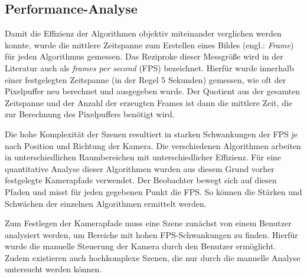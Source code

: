 \documentclass[crop=false]{standalone}
\begin{document}
    \subsection{Performance-Analyse} %
    \label{ssub:performance_analyse}
      Damit die Effizienz der Algorithmen objektiv miteinander verglichen werden konnte, wurde die mittlere Zeitspanne zum Erstellen eines Bildes (engl.: \textit{Frame}) für jeden Algorithmus gemessen.
      Das Reziproke dieser Messgröße wird in der Literatur auch als \textit{frames per second} (FPS) bezeichnet.
      Hierfür wurde innerhalb einer festgelegten Zeitspanne (in der Regel 5 Sekunden) gemessen, wie oft der Pixelpuffer neu berechnet und ausgegeben wurde.
      Der Quotient aus der gesamten Zeitspanne und der Anzahl der erzeugten Frames ist dann die mittlere Zeit, die zur Berechnung des Pixelpuffers benötigt wird.

      Die hohe Komplexität der Szenen resultiert in starken Schwankungen der FPS je nach Position und Richtung der Kamera.
      Die verschiedenen Algorithmen arbeiten in unterschiedlichen Raumbereichen mit unterschiedlicher Effizienz.
      Für eine quantitative Analyse dieser Algorithmen wurden aus diesem Grund vorher festgelegte Kamerapfade verwendet.
      Der Beobachter bewegt sich auf diesen Pfaden und misst für jeden gegebenen Punkt die FPS.
      So können die Stärken und Schwächen der einzelnen Algorithmen ermittelt werden.

      Zum Festlegen der Kamerapfade muss eine Szene zunächst von einem Benutzer analysiert werden, um Bereiche mit hohen FPS-Schwankungen zu finden.
      Hierfür wurde die manuelle Steuerung der Kamera durch den Benutzer ermöglicht.
      Zudem existieren auch hochkomplexe Szenen, die nur durch die manuelle Analyse untersucht werden können.
\end{document}
